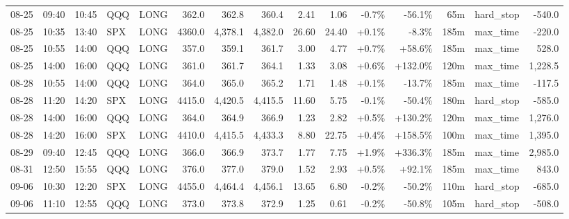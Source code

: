\documentclass[11pt,a4paper,twoside]{article}
\begin{document}
\begin{landscape}
\begin{center}
\begin{longtable}{>{\color{txtmain}}l l l l l r r r r r r r r >{\color{txtmain}}l r}
08-25 & 09:40 & 10:45 & QQQ & LONG & 362.0 & 362.8 & 360.4 & 2.41 & 1.06 & \textcolor{lossred}{-0.7\%} & \textcolor{lossred}{-56.1\%} & 65m & hard\_stop & \textcolor{lossred}{-540.0} \\
08-25 & 10:35 & 13:40 & SPX & LONG & 4360.0 & 4,378.1 & 4,382.0 & 26.60 & 24.40 & \textcolor{wingreen}{+0.1\%} & \textcolor{lossred}{-8.3\%} & 185m & max\_time & \textcolor{lossred}{-220.0} \\
08-25 & 10:55 & 14:00 & QQQ & LONG & 357.0 & 359.1 & 361.7 & 3.00 & 4.77 & \textcolor{wingreen}{+0.7\%} & \textcolor{wingreen}{+58.6\%} & 185m & max\_time & \textcolor{wingreen}{528.0} \\
08-25 & 14:00 & 16:00 & QQQ & LONG & 361.0 & 361.7 & 364.1 & 1.33 & 3.08 & \textcolor{wingreen}{+0.6\%} & \textcolor{wingreen}{+132.0\%} & 120m & max\_time & \textcolor{wingreen}{1,228.5} \\
08-28 & 10:55 & 14:00 & QQQ & LONG & 364.0 & 365.0 & 365.2 & 1.71 & 1.48 & \textcolor{wingreen}{+0.1\%} & \textcolor{lossred}{-13.7\%} & 185m & max\_time & \textcolor{lossred}{-117.5} \\
08-28 & 11:20 & 14:20 & SPX & LONG & 4415.0 & 4,420.5 & 4,415.5 & 11.60 & 5.75 & \textcolor{lossred}{-0.1\%} & \textcolor{lossred}{-50.4\%} & 180m & hard\_stop & \textcolor{lossred}{-585.0} \\
08-28 & 14:00 & 16:00 & QQQ & LONG & 364.0 & 364.9 & 366.9 & 1.23 & 2.82 & \textcolor{wingreen}{+0.5\%} & \textcolor{wingreen}{+130.2\%} & 120m & max\_time & \textcolor{wingreen}{1,276.0} \\
08-28 & 14:20 & 16:00 & SPX & LONG & 4410.0 & 4,415.5 & 4,433.3 & 8.80 & 22.75 & \textcolor{wingreen}{+0.4\%} & \textcolor{wingreen}{+158.5\%} & 100m & max\_time & \textcolor{wingreen}{1,395.0} \\
08-29 & 09:40 & 12:45 & QQQ & LONG & 366.0 & 366.9 & 373.7 & 1.77 & 7.75 & \textcolor{wingreen}{+1.9\%} & \textcolor{wingreen}{+336.3\%} & 185m & max\_time & \textcolor{wingreen}{2,985.0} \\
08-31 & 12:50 & 15:55 & QQQ & LONG & 376.0 & 377.0 & 379.0 & 1.52 & 2.93 & \textcolor{wingreen}{+0.5\%} & \textcolor{wingreen}{+92.1\%} & 185m & max\_time & \textcolor{wingreen}{843.0} \\
09-06 & 10:30 & 12:20 & SPX & LONG & 4455.0 & 4,464.4 & 4,456.1 & 13.65 & 6.80 & \textcolor{lossred}{-0.2\%} & \textcolor{lossred}{-50.2\%} & 110m & hard\_stop & \textcolor{lossred}{-685.0} \\
09-06 & 11:10 & 12:55 & QQQ & LONG & 373.0 & 373.8 & 372.9 & 1.25 & 0.61 & \textcolor{lossred}{-0.2\%} & \textcolor{lossred}{-50.8\%} & 105m & hard\_stop & \textcolor{lossred}{-508.0} \\

\end{longtable}
\end{center}
\end{landscape}
\end{document}
